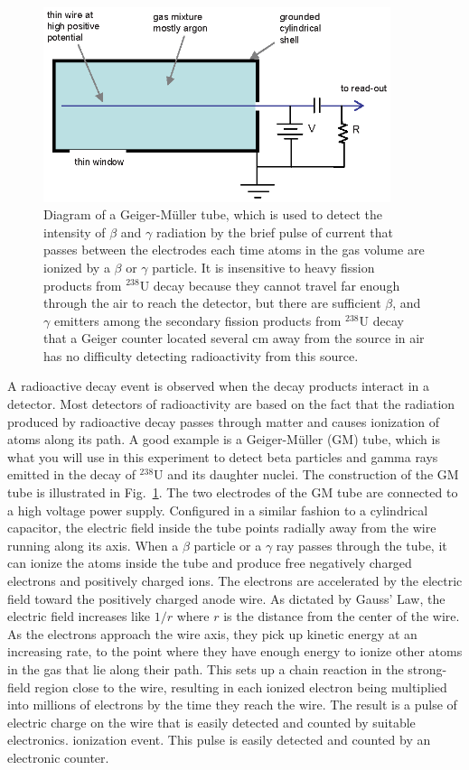 \documentclass{revtex4}
\begin{document}
\begin{figure}
\includegraphics[width=4in]{geigertube.eps}
\caption{\label{geigertube}
Diagram of a Geiger-M\"{u}ller tube, which is used to detect the intensity
of $\beta$ and $\gamma$ radiation by the brief pulse of current that passes
between the electrodes each time atoms in the gas volume are ionized by a
$\beta$ or $\gamma$ particle.  It is insensitive to heavy fission products
from $^{238}$U decay because they cannot travel far enough through the air
to reach the detector, but there are sufficient $\beta$, and $\gamma$
emitters among the secondary fission products from $^{238}$U decay that a
Geiger counter located several cm away from the source in air has no
difficulty detecting radioactivity from this source.}
\end{figure}

A radioactive decay event is observed when the decay products interact in a
detector.  Most detectors of radioactivity are based on the fact that the
radiation produced by radioactive decay passes through matter and causes
ionization of atoms along its path.  A good example is a Geiger-M\"{u}ller (GM)
tube, which is what you will use in this experiment to detect beta particles
and gamma rays emitted in the decay of $^{238}$U and its daughter nuclei.
The construction of the GM tube is illustrated in Fig.~\ref{geigertube}. The
two electrodes of the GM tube are connected to a high voltage power supply.
Configured in a similar fashion to a cylindrical capacitor, the electric
field inside the tube points radially away from the wire running along its
axis.  When a $\beta$ particle or a $\gamma$ ray passes through the tube, it
can ionize the atoms inside the tube and produce free negatively charged
electrons and positively charged ions. The electrons are accelerated by the
electric field toward the positively charged anode wire.  As dictated by
Gauss' Law, the electric field increases like $1/r$ where $r$ is the distance
from the center of the wire.  As the electrons approach the wire axis, they
pick up kinetic energy at an increasing rate, to the point where they have
enough energy to ionize other atoms in the gas that lie along their path.
This sets up a chain reaction in the strong-field region close to the wire,
resulting in each ionized electron being multiplied into millions of
electrons by the time they reach the wire.  The result is a pulse of
electric charge on the wire that is easily detected and counted by suitable
electronics.  ionization event. This pulse is easily detected and counted by
an electronic counter.
\end{document}
